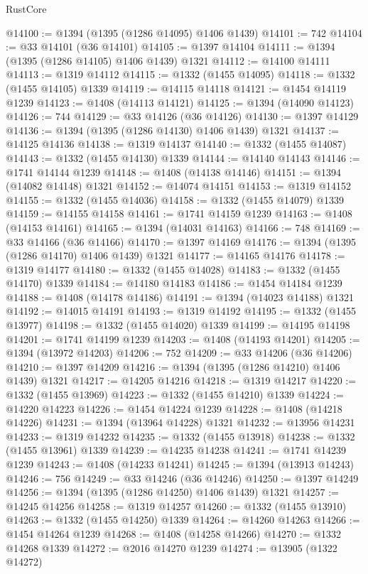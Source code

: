 \begin{lexlean}{RustCore}
\begin{coremodule}
@14100 := @1394 (@1395 (@1286 @14095) @1406 @1439)
@14101 := 742
@14104 := @33 @14101 (@36 @14101)
@14105 := @1397 @14104
@14111 := @1394 (@1395 (@1286 @14105) @1406 @1439) @1321
@14112 := @14100 @14111
@14113 := @1319 @14112
@14115 := @1332 (@1455 @14095)
@14118 := @1332 (@1455 @14105) @1339
@14119 := @14115 @14118
@14121 := @1454 @14119 @1239
@14123 := @1408 (@14113 @14121)
@14125 := @1394 (@14090 @14123)
@14126 := 744
@14129 := @33 @14126 (@36 @14126)
@14130 := @1397 @14129
@14136 := @1394 (@1395 (@1286 @14130) @1406 @1439) @1321
@14137 := @14125 @14136
@14138 := @1319 @14137
@14140 := @1332 (@1455 @14087)
@14143 := @1332 (@1455 @14130) @1339
@14144 := @14140 @14143
@14146 := @1741 @14144 @1239
@14148 := @1408 (@14138 @14146)
@14151 := @1394 (@14082 @14148) @1321
@14152 := @14074 @14151
@14153 := @1319 @14152
@14155 := @1332 (@1455 @14036)
@14158 := @1332 (@1455 @14079) @1339
@14159 := @14155 @14158
@14161 := @1741 @14159 @1239
@14163 := @1408 (@14153 @14161)
@14165 := @1394 (@14031 @14163)
@14166 := 748
@14169 := @33 @14166 (@36 @14166)
@14170 := @1397 @14169
@14176 := @1394 (@1395 (@1286 @14170) @1406 @1439) @1321
@14177 := @14165 @14176
@14178 := @1319 @14177
@14180 := @1332 (@1455 @14028)
@14183 := @1332 (@1455 @14170) @1339
@14184 := @14180 @14183
@14186 := @1454 @14184 @1239
@14188 := @1408 (@14178 @14186)
@14191 := @1394 (@14023 @14188) @1321
@14192 := @14015 @14191
@14193 := @1319 @14192
@14195 := @1332 (@1455 @13977)
@14198 := @1332 (@1455 @14020) @1339
@14199 := @14195 @14198
@14201 := @1741 @14199 @1239
@14203 := @1408 (@14193 @14201)
@14205 := @1394 (@13972 @14203)
@14206 := 752
@14209 := @33 @14206 (@36 @14206)
@14210 := @1397 @14209
@14216 := @1394 (@1395 (@1286 @14210) @1406 @1439) @1321
@14217 := @14205 @14216
@14218 := @1319 @14217
@14220 := @1332 (@1455 @13969)
@14223 := @1332 (@1455 @14210) @1339
@14224 := @14220 @14223
@14226 := @1454 @14224 @1239
@14228 := @1408 (@14218 @14226)
@14231 := @1394 (@13964 @14228) @1321
@14232 := @13956 @14231
@14233 := @1319 @14232
@14235 := @1332 (@1455 @13918)
@14238 := @1332 (@1455 @13961) @1339
@14239 := @14235 @14238
@14241 := @1741 @14239 @1239
@14243 := @1408 (@14233 @14241)
@14245 := @1394 (@13913 @14243)
@14246 := 756
@14249 := @33 @14246 (@36 @14246)
@14250 := @1397 @14249
@14256 := @1394 (@1395 (@1286 @14250) @1406 @1439) @1321
@14257 := @14245 @14256
@14258 := @1319 @14257
@14260 := @1332 (@1455 @13910)
@14263 := @1332 (@1455 @14250) @1339
@14264 := @14260 @14263
@14266 := @1454 @14264 @1239
@14268 := @1408 (@14258 @14266)
@14270 := @1332 @14268 @1339
@14272 := @2016 @14270 @1239
@14274 := @13905 (@1322 @14272)

\end{coremodule}
\end{lexlean}

